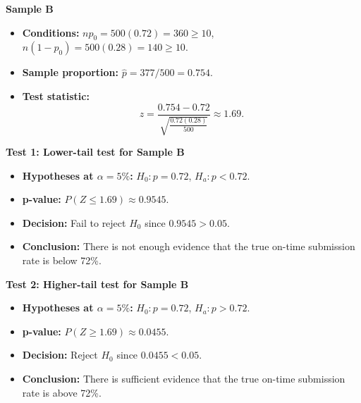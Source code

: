 \textbf{Sample B}

\begin{itemize}
	\item \textbf{Conditions:} \(np_0=500(0.72)=360\ge10\), \(n(1-p_0)=500(0.28)=140\ge10\).
	\item \textbf{Sample proportion:} \(\hat p=377/500=0.754\).
	\item \textbf{Test statistic:}
	\[
	z=\frac{0.754-0.72}{\sqrt{\frac{0.72(0.28)}{500}}}\approx 1.69.
	\]
\end{itemize}

\textbf{Test 1: Lower-tail test for Sample B}

\begin{itemize}
	\item \textbf{Hypotheses at \(\alpha=5\%\):} \(H_0\colon p=0.72\), \(H_a\colon p<0.72\).
	\item \textbf{p-value:} \(P(Z\le 1.69)\approx 0.9545\).
	\item \textbf{Decision:} Fail to reject \(H_0\) since \(0.9545>0.05\).
	\item \textbf{Conclusion:} There is not enough evidence that the true on-time submission rate is below 72\%.
\end{itemize}

\begin{center}
\end{center}


\textbf{Test 2: Higher-tail test for Sample B}

\begin{itemize}
	\item \textbf{Hypotheses at \(\alpha=5\%\):} \(H_0\colon p=0.72\), \(H_a\colon p>0.72\).
	\item \textbf{p-value:} \(P(Z\ge 1.69)\approx 0.0455\).
	\item \textbf{Decision:} Reject \(H_0\) since \(0.0455<0.05\).
	\item \textbf{Conclusion:} There is sufficient evidence that the true on-time submission rate is above 72\%.
\end{itemize}

\begin{center}
\end{center}


